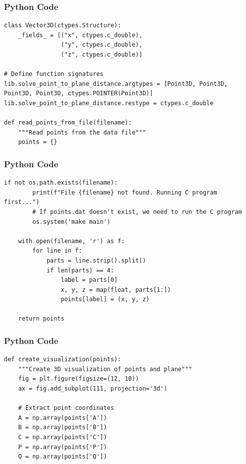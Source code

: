 \documentclass{beamer}
\begin{document}
\begin{frame}[fragile]
    \frametitle{Python Code}
    \begin{lstlisting}
class Vector3D(ctypes.Structure):
    _fields_ = [("x", ctypes.c_double),
                ("y", ctypes.c_double),
                ("z", ctypes.c_double)]

# Define function signatures
lib.solve_point_to_plane_distance.argtypes = [Point3D, Point3D, Point3D, Point3D, ctypes.POINTER(Point3D)]
lib.solve_point_to_plane_distance.restype = ctypes.c_double

def read_points_from_file(filename):
    """Read points from the data file"""
    points = {}
    \end{lstlisting}
\end{frame}

\begin{frame}[fragile]
    \frametitle{Python Code}
    \begin{lstlisting}
if not os.path.exists(filename):
        print(f"File {filename} not found. Running C program first...")
        # If points.dat doesn't exist, we need to run the C program
        os.system('make main')

    with open(filename, 'r') as f:
        for line in f:
            parts = line.strip().split()
            if len(parts) == 4:
                label = parts[0]
                x, y, z = map(float, parts[1:])
                points[label] = (x, y, z)

    return points
    \end{lstlisting}
\end{frame}

\begin{frame}[fragile]
    \frametitle{Python Code}
    \begin{lstlisting}
def create_visualization(points):
    """Create 3D visualization of points and plane"""
    fig = plt.figure(figsize=(12, 10))
    ax = fig.add_subplot(111, projection='3d')

    # Extract point coordinates
    A = np.array(points['A'])
    B = np.array(points['B'])
    C = np.array(points['C'])
    P = np.array(points['P'])
    Q = np.array(points['Q'])
    \end{lstlisting}
\end{frame}
\end{document}

